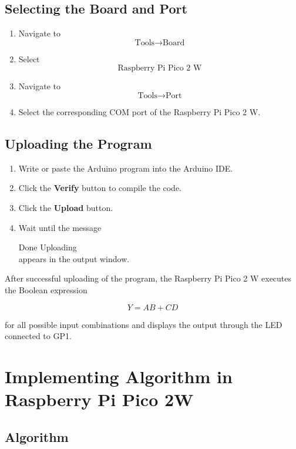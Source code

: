 \documentclass[12pt,a4paper]{article}
\begin{document}
\subsection{Selecting the Board and Port}

\begin{enumerate}
    \item Navigate to
    \[
    \text{Tools} \rightarrow \text{Board}
    \]

    \item Select
    \[
    \text{Raspberry Pi Pico 2 W}
    \]

    \item Navigate to
    \[
    \text{Tools} \rightarrow \text{Port}
    \]

    \item Select the corresponding COM port of the Raspberry Pi Pico 2 W.
\end{enumerate}

\subsection{Uploading the Program}

\begin{enumerate}
    \item Write or paste the Arduino program into the Arduino IDE.
    \item Click the \textbf{Verify} button to compile the code.
    \item Click the \textbf{Upload} button.
    \item Wait until the message

Done Uploading\\
appears in the output window.
\end{enumerate}


After successful uploading of the program, the Raspberry Pi Pico 2 W executes the Boolean expression

$$
Y = AB + CD
$$

for all possible input combinations and displays the output through the LED connected to GP1.

\section{Implementing Algorithm in Raspberry Pi Pico 2W}

\subsection{Algorithm}
\end{document}
